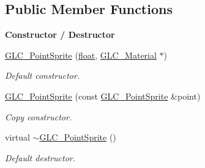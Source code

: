 \subsection*{Public Member Functions}
\begin{Indent}{\bf Constructor / Destructor}\par
\begin{DoxyCompactItemize}
\item 
\hyperlink{class_g_l_c___point_sprite_a3b2e104058e21de4926d5f68dbe9e62f}{G\-L\-C\-\_\-\-Point\-Sprite} (\hyperlink{_super_l_u_support_8h_a6a1bb6ed41f44b60e7bd83b0e9945aa7}{float}, \hyperlink{class_g_l_c___material}{G\-L\-C\-\_\-\-Material} $\ast$)
\begin{DoxyCompactList}\small\item\em Default constructor. \end{DoxyCompactList}\item 
\hyperlink{class_g_l_c___point_sprite_a0064edd157449a2729da1de64ce0d63e}{G\-L\-C\-\_\-\-Point\-Sprite} (const \hyperlink{class_g_l_c___point_sprite}{G\-L\-C\-\_\-\-Point\-Sprite} \&point)
\begin{DoxyCompactList}\small\item\em Copy constructor. \end{DoxyCompactList}\item 
virtual \hyperlink{class_g_l_c___point_sprite_a6768df481daac521573e072b4dab2bf6}{$\sim$\-G\-L\-C\-\_\-\-Point\-Sprite} ()
\begin{DoxyCompactList}\small\item\em Default destructor. \end{DoxyCompactList}\end{DoxyCompactItemize}
\end{Indent}
